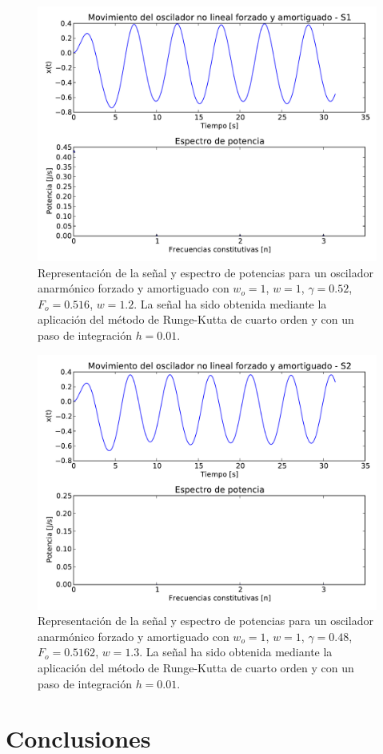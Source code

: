 \documentclass[11pt]{article}
\begin{document}
\begin{figure}
\centering
\includegraphics[width=0.75\linewidth]{caso_anarmonico_s1.pdf}
\caption{Representación de la señal y espectro de potencias para un oscilador anarmónico forzado y amortiguado con $w_o = 1$, $w = 1$, $\gamma = 0.52$, $F_o = 0.516$, $w = 1.2$. La señal ha sido obtenida mediante la aplicación del método de Runge-Kutta de cuarto orden y con un paso de integración $h = 0.01$.}
\label{fig:caso_anarmonico_s1}
\end{figure}

\begin{figure}
\centering
\includegraphics[width=0.75\linewidth]{caso_anarmonico_s2.pdf}
\caption{Representación de la señal y espectro de potencias para un oscilador anarmónico forzado y amortiguado con $w_o = 1$, $w = 1$, $\gamma = 0.48$, $F_o = 0.5162$, $w = 1.3$. La señal ha sido obtenida mediante la aplicación del método de Runge-Kutta de cuarto orden y con un paso de integración $h = 0.01$.}
\label{fig:caso_anarmonico_s2}
\end{figure}

\section{Conclusiones}
\end{document}
